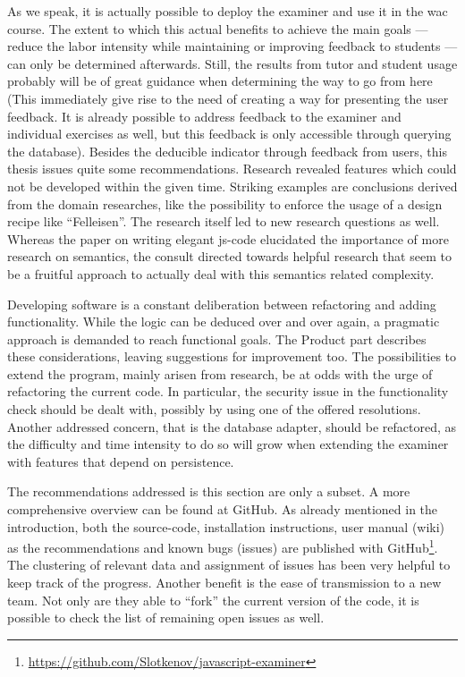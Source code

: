 As we speak, it is actually possible to deploy the \gls{examiner} and use it in 
the \gls{wac} course. The extent to which this actual benefits to achieve 
the main goals
--- reduce the labor intensity while maintaining or improving feedback to 
students --- can only be determined afterwards. Still, the results from 
\gls{tutor} and \gls{student} usage probably will be of great guidance when 
determining the way to go from here (This immediately give rise to the need of
creating a way for presenting the user feedback. It is already possible to
address feedback to the \gls{examiner} and individual \glspl{exercise} as well,
but this feedback is only accessible through querying the database).
Besides the deducible indicator through feedback from users, this 
thesis issues quite some recommendations. Research revealed
features which could not be developed within the given time. Striking
examples are conclusions derived from the domain researches, like the possibility
to enforce the usage of a design recipe like ``Felleisen''. The research itself
led to new research questions as well. Whereas the paper on writing elegant
\gls{js-code} elucidated the importance of more research on semantics, the
consult directed towards helpful research that seem to be a fruitful approach
to actually deal with this semantics related complexity.


Developing software is a constant deliberation between refactoring and adding
functionality. While the logic can be deduced over and over again, a pragmatic
approach is demanded to reach functional goals. The Product part describes these
considerations, leaving suggestions for improvement too. The possibilities to
extend the program, mainly arisen from research, be at odds with the urge of
refactoring the current code. In particular, the security issue in the 
functionality check should be dealt with, possibly by using one of the offered
resolutions. Another addressed concern, that is the database adapter, should be
refactored, as the difficulty and time intensity to do so will grow when extending
the \gls{examiner} with features that depend on persistence.


The recommendations addressed is this section are only a subset. A more 
comprehensive overview can be found at GitHub. As already mentioned in the 
introduction, both the \gls{source-code}, 
installation instructions, user manual (wiki) as the recommendations and known 
bugs (issues) are published with 
GitHub\footnote{\url{https://github.com/Slotkenov/javascript-examiner}}. 
The clustering of relevant data and assignment
of issues has been very helpful to keep track of the progress. Another benefit 
is the ease of transmission to a new team. Not only are they able to ``fork'' 
the current version of the code, it is possible to check the list of 
remaining open issues as well.


